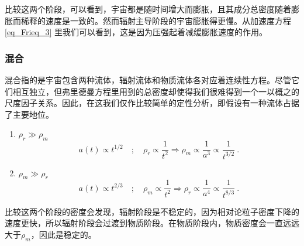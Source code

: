 比较这两个阶段，可以看到，宇宙都是随时间增大而膨胀，且其成分总密度随着膨胀而稀释的速度是一致的。然而辐射主导阶段的宇宙膨胀得更慢。从加速度方程\autoref{eq_Frieq_3} 里我们可以看到，这是因为压强起着减缓膨胀速度的作用。
\subsubsection{混合}

混合指的是宇宙包含两种流体，辐射流体和物质流体各对应着连续性方程。尽管它们相互独立，但弗里德曼方程里用到的总密度却使得我们很难得到一个一以概之的尺度因子关系。因此，在这我们仅作比较简单的定性分析，即假设有一种流体占据了主要地位。
\begin{enumerate}
\item $\rho_r\gg\rho_m$
\begin{equation}
a(t) \propto t^{1 / 2} \quad ; \quad \rho_{r} \propto \frac{1}{t^{2}}  \Longrightarrow\rho_{m} \propto \frac{1}{a^{3}} \propto \frac{1}{t^{3 / 2}}~.
\end{equation}
\item $\rho_m\gg\rho_r$
\begin{equation}
a(t) \propto t^{2 / 3} \quad ; \quad \rho_{m} \propto \frac{1}{t^{2}}  \Longrightarrow\rho_{r} \propto \frac{1}{a^{4}} \propto \frac{1}{t^{8 / 3}}~.
\end{equation}
\end{enumerate}

比较这两个阶段的密度会发现，辐射阶段是不稳定的，因为相对论粒子密度下降的速度更快，所以辐射阶段会过渡到物质阶段。在物质阶段内，物质密度会一直远远大于$\rho_m$，因此是稳定的。
